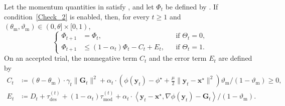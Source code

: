 \documentclass{article}
\begin{document}
\begin{lemma}
\label{energy_1}
Let the momentum quantities in  satisfy
, and let \(\Phi_t\) be defined by
. If condition~\eqref{Check_2} is enabled,
then, for every $t\ge1$ and
$(\theta_{\mathrm{m}},\vartheta_{\mathrm{m}})
\in(0,\theta]\times[0,1)$, 
\begin{equation}\label{energy_Ite}
\left\{
\begin{aligned}
\Phi_{t+1}
&=\Phi_t,
&&\text{if }\Theta_t=0,\\
\Phi_{t+1}
&\le
(1-\alpha_t)\Phi_t-C_t+E_t,
&&\text{if }\Theta_t=1.
\end{aligned}
\right.
\end{equation}
On an accepted trial, the nonnegative term \(C_t\) and the
error term \(E_t\) are defined by
\begin{align}
 {C}_t
&\coloneqq 
(\theta-\theta_{\mathrm{m}})\cdot
\gamma_t\|\mathbf{G}_t\|^2
+
\alpha_t\cdot\left(
\phi(\bm{y}_t)-\phi^\star
+\frac{\mu}{2}\|\bm{y}_t-\bm{x}^\star\|^2
\right) {\vartheta_{\mathrm{m}}}/
{(1-\vartheta_{\mathrm{m}})}
\ge0,
\label{T_c}\\[2mm]
 {E}_t
&\coloneqq 
D_t+\tau_{\mathrm{des}}^{(t)}
+(1-\alpha_t)\tau_{\mathrm{mod}}^{(t)}
+{\alpha_t}\cdot
\left\langle
\bm{y}_t-\bm{x}^\star,\nabla\phi(\bm{y}_t)-\mathbf{G}_t
\right\rangle/{(1-\vartheta_{\mathrm{m}})} .
\label{T_e}
\end{align}
\end{lemma}
\end{document}
